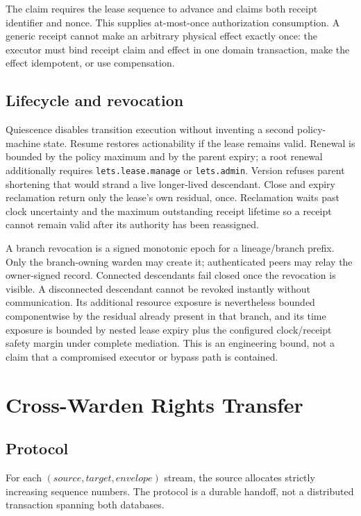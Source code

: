 \documentclass[10pt]{article}
\newcommand{\code}[1]{\nolinkurl{#1}}
\begin{document}
The claim requires the lease sequence to advance and claims both receipt identifier and nonce.
This supplies at-most-once authorization consumption. A generic receipt cannot make an arbitrary
physical effect exactly once: the executor must bind receipt claim and effect in one domain
transaction, make the effect idempotent, or use compensation.

\subsection{Lifecycle and revocation}

Quiescence disables transition execution without inventing a second policy-machine state. Resume
restores actionability if the lease remains valid. Renewal is bounded by the policy maximum and by
the parent expiry; a root renewal additionally requires \code{lets.lease.manage} or
\code{lets.admin}. Version \ArtifactVersion{} refuses parent shortening that would strand a live longer-lived
descendant. Close and expiry reclamation return only the lease's own residual, once.
Reclamation waits past clock uncertainty and the maximum outstanding receipt lifetime so a receipt
cannot remain valid after its authority has been reassigned.

A branch revocation is a signed monotonic epoch for a lineage/branch prefix. Only the branch-owning
warden may create it; authenticated peers may relay the owner-signed record. Connected descendants
fail closed once the revocation is visible. A disconnected descendant cannot be revoked instantly
without communication. Its additional resource exposure is nevertheless bounded componentwise by
the residual already present in that branch, and its time exposure is bounded by nested lease
expiry plus the configured clock/receipt safety margin under complete mediation. This is an
engineering bound, not a claim that a compromised executor or bypass path is contained.

\section{Cross-Warden Rights Transfer}

\subsection{Protocol}

For each $(source,target,envelope)$ stream, the source allocates strictly increasing sequence
numbers. The protocol is a durable handoff, not a distributed transaction spanning both databases.
\end{document}
